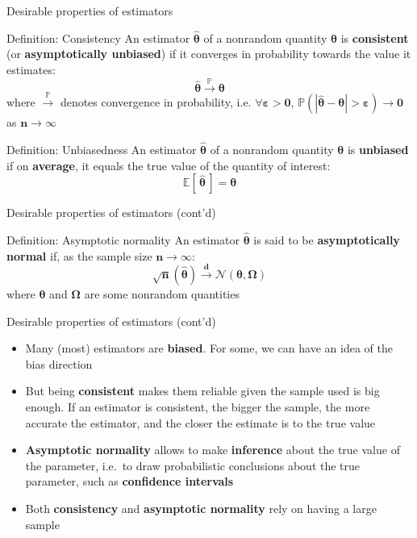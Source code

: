 \documentclass[
  ignorenonframetext,
  aspectratio=169]{beamer}
\providecommand{\tightlist}{%
  \setlength{\itemsep}{0pt}\setlength{\parskip}{0pt}}
\begin{document}
\begin{frame}{Desirable properties of estimators}
\protect\hypertarget{desirable-properties-of-estimators}{}
\begin{block}{Definition: Consistency}
An estimator $\bm{\hat{\theta}}$ of a nonrandom quantity $\bm{\theta}$ is \textbf{consistent} (or \textbf{asymptotically unbiased}) if it converges in probability towards the value it estimates:
\[
\bm{\hat{\theta}} \overset{\mathbb{P}}{\rightarrow}  \bm{\theta}
\]
where $\overset{\mathbb{P}}{\rightarrow}$ denotes convergence in probability, i.e. $\bm{\forall \varepsilon>0}$, $\bm{\mathbb{P}\left( |\hat{\theta} - \theta| > \varepsilon  \right) \rightarrow 0}$ as $\bm{n \rightarrow \infty}$
\end{block}

\begin{block}{Definition: Unbiasedness}
An estimator $\bm{\hat{\theta}}$ of a nonrandom quantity $\bm{\theta}$ is \textbf{unbiased} if on \textbf{average}, it equals the true value of the quantity of interest:
\[
\bm{\mathbb{E}[\, \hat{\theta} \,]= \theta}
\]
\end{block}
\end{frame}

\begin{frame}{Desirable properties of estimators (cont'd)}
\protect\hypertarget{desirable-properties-of-estimators-contd}{}
\begin{block}{Definition: Asymptotic normality}
An estimator $\bm{\hat{\theta}}$ is said to be \textbf{asymptotically normal} if, as the sample size $\bm{n\rightarrow \infty}$:
\[
\bm{{\sqrt{n}(\hat{\theta}) \overset{d}{\rightarrow} \mathcal{N}(\theta, \Omega)}}
\]
where $\bm{\theta}$ and $\bm{\Omega}$ are some nonrandom quantities
\end{block}
\end{frame}

\begin{frame}{Desirable properties of estimators (cont'd)}
\protect\hypertarget{desirable-properties-of-estimators-contd-1}{}
\begin{itemize}
\tightlist
\item
  Many (most) estimators are \textbf{biased}. For some, we can have an
  idea of the bias direction
\item
  But being \textbf{consistent} makes them reliable given the sample
  used is big enough. If an estimator is consistent, the bigger the
  sample, the more accurate the estimator, and the closer the estimate
  is to the true value
\item
  \textbf{Asymptotic normality} allows to make \textbf{inference} about
  the true value of the parameter, i.e.~to draw probabilistic
  conclusions about the true parameter, such as
  \textbf{confidence intervals}
\item
  Both \textbf{consistency} and \textbf{asymptotic normality} rely on
  having a large sample
\end{itemize}
\end{frame}
\end{document}
